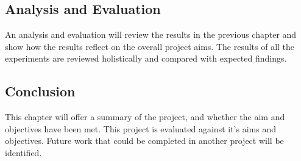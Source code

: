 \subsection*{Analysis and Evaluation}
An analysis and evaluation will review the results in the previous chapter and
show how the results reflect on the overall project aims. The results of all the
experiments are reviewed holistically and compared with expected findings.

\subsection*{Conclusion}
This chapter will offer a summary of the project, and whether the aim and
objectives have been met. This project is evaluated against it's aims and
objectives. Future work that could be completed in another project will be
identified.